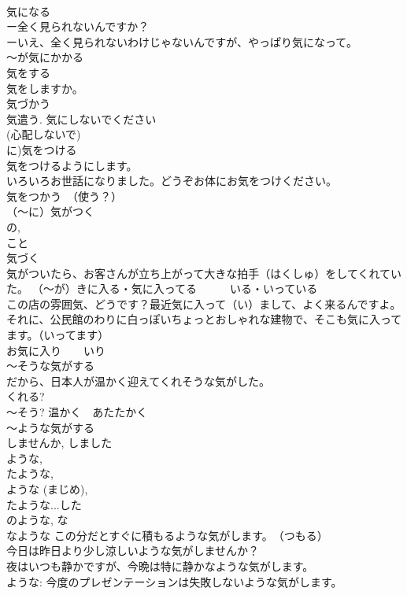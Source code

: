 \documentclass[8pt]{extreport}
\begin{document}
\begin{CJK}{UTF8}{min}
\\	気になる 
\\	ー全く見られないんですか？ 
\\	ーいえ、全く見られないわけじゃないんですが、やっぱり気になって。 
\\	～が気にかかる 
\\	気をする 
\\	気をしますか。　
\\	気づかう　 
\\	気遣う. 気にしないでください 
\\	(心配しないで)
\\	に)気をつける 
\\	気をつけるようにします。 
\\	いろいろお世話になりました。どうぞお体にお気をつけください。 
\\	気をつかう　（使う？） 
\\	（～に）気がつく 
\\	の, 
\\	こと 
\\	気づく　
\\	気がついたら、お客さんが立ち上がって大きな拍手（はくしゅ）をしてくれていた。 （～が）きに入る・気に入ってる　　　いる・いっている 
\\	この店の雰囲気、どうです？最近気に入って（い）まして、よく来るんですよ。 それに、公民館のわりに白っぽいちょっとおしゃれな建物で、そこも気に入ってます。（いってます） 
\\	お気に入り　　いり 
\\	～そうな気がする 
\\	だから、日本人が温かく迎えてくれそうな気がした。 
\\	くれる?　
\\	～そう? 温かく　あたたかく 
\\	～ような気がする 
\\	しませんか, しました 
\\	ような, 
\\	たような, 
\\	ような (まじめ), 
\\	たような...した 
\\	のような, な
\\	なような この分だとすぐに積もるような気がします。　（つもる） 
\\	今日は昨日より少し涼しいような気がしませんか？ 
\\	夜はいつも静かですが、今晩は特に静かなような気がします。 
\\	ような: 今度のプレゼンテーションは失敗しないような気がします。 

\end{CJK}
\end{document}
